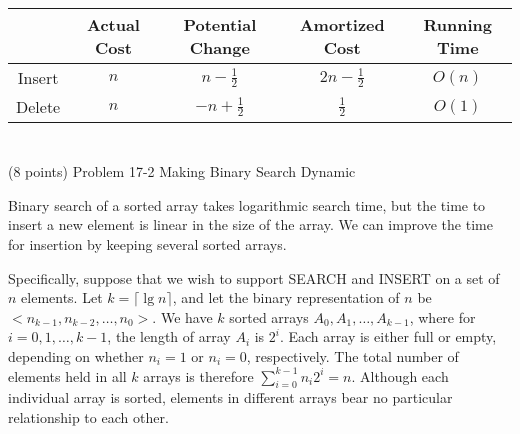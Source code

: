 \documentclass[paper=a4, fontsize=11pt]{scrartcl} %
\begin{document}
\begin{table}[hp]
  \centering
  \begin{tabular}[hp]{ccccc}
    & Actual Cost & Potential Change & Amortized Cost & Running Time\\
    \hline
    Insert & $n$ & $n-\frac{1}{2}$  & $2n-\frac{1}{2}$ & $O(n)$\\
    Delete & $n$ & $-n+\frac{1}{2}$ & $\frac{1}{2}$   & $O(1)$\\
  \end{tabular}
\end{table}

\pagebreak

\section{}

\begin{fancyquotes}
  (8 points) Problem 17-2 Making Binary Search Dynamic

  Binary search of a sorted array takes logarithmic search time, but
  the time to insert a new element is linear in the size of the
  array. We can improve the time for insertion by keeping several
  sorted arrays.

  Specifically, suppose that we wish to support \textsc{SEARCH} and
  \textsc{INSERT} on a set of $n$ elements. Let $k =
  \lceil\lg{n}\rceil$, and let the binary representation of $n$ be
  $<n_{k-1},n_{k-2},\ldots,n_0>$. We have $k$ sorted arrays $A_0,
  A_1,\ldots, A_{k-1}$, where for $i = 0,1,\ldots,k-1$, the length of
  array $A_i$ is $2^i$. Each array is either full or empty, depending
  on whether $n_i = 1$ or $n_i = 0$, respectively. The total number of
  elements held in all $k$ arrays is therefore $\sum_{i=0}^{k-1}{n_i
    2^i} = n$. Although each individual array is sorted, elements in
  different arrays bear no particular relationship to each other.
\end{fancyquotes}
\end{document}
